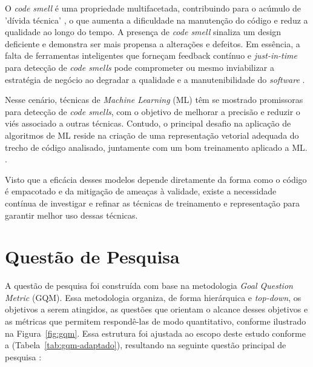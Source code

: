 O \textit{code smell} é uma propriedade multifacetada, contribuindo para o acúmulo de 'dívida técnica' 
\cite{Hasantha2021}, o que aumenta a dificuldade na manutenção do código e reduz a qualidade ao longo do tempo. 
A presença de \textit{code smell} sinaliza um design deficiente e demonstra ser mais propensa a alterações e defeitos.
Em essência, a falta de ferramentas inteligentes que forneçam feedback contínuo e 
\textit{just-in-time} para detecção de \textit{code smells} pode comprometer ou mesmo inviabilizar a estratégia de negócio ao 
degradar a qualidade e a manutenibilidade do \textit{software} \cite{Haroon2025}.

Nesse cenário, técnicas de \textit{Machine Learning} (ML) têm se mostrado promissoras para detecção de \textit{code smells}, 
com o objetivo de melhorar a precisão e reduzir o viés associado a outras técnicas. Contudo, o principal 
desafio na aplicação de algoritmos de ML reside na criação de uma representação vetorial adequada do trecho 
de código analisado, juntamente com um bom treinamento aplicado a ML. \cite{Haroon2025}.

Visto que a eficácia desses modelos depende diretamente da forma como o código é empacotado e da mitigação de 
ameaças à validade, existe a necessidade contínua de investigar e refinar as técnicas de treinamento e 
representação para garantir melhor uso dessas técnicas.


\section{Questão de Pesquisa}

\label{qp_principal}

A questão de pesquisa foi construída com base na metodologia \textit{Goal Question Metric} (GQM)\cite{Basili1994}. 
Essa metodologia organiza, de forma hierárquica e \textit{top-down}, os objetivos a serem atingidos, as questões que orientam o alcance desses objetivos e 
as métricas que permitem respondê-las de modo quantitativo, 
conforme ilustrado na Figura~\ref{fig:gqm}. Essa estrutura foi ajustada ao escopo deste estudo conforme a (Tabela~\ref{tab:gqm-adaptado}), resultando na seguinte questão principal de pesquisa :

